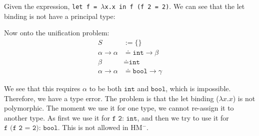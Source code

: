 \begin{Example}

\label{ex:let-not-poly}
    
Given the expression, \texttt{let f = $\lambda$x.x in f (f\ 2 = 2)}. We can see that the let binding is not have a principal type:

\vspace{1em}
\Large
{}
\normalsize

\vspace{1em}
\noindent
Now onto the unification problem:
\begin{align*}
    S&:=\{\}\\
    \alpha\to\alpha &\doteq \texttt{int}\to\beta\\
    \beta &\doteq \texttt{int}\\
    \alpha\to\alpha &\doteq \texttt{bool}\to\gamma
\end{align*}

\noindent
We see that this requires $\alpha$ to be both $\texttt{int}$ and $\texttt{bool}$, which is impossible. Therefore, we have a type error.
The problem is that the let binding ($\lambda x.x$) is not polymorphic. The moment we use it for one type, we cannot re-assign it to another type.
As first we use it for $\texttt{f 2: int}$, and then we try to use it for $\texttt{f (f\ 2 = 2): bool}$. This is not allowed in HM$^-$.
\end{Example}


